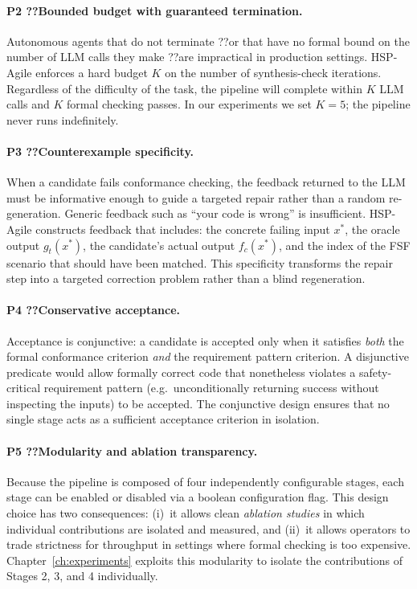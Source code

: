 \paragraph{P2 ??Bounded budget with guaranteed termination.}
Autonomous agents that do not terminate ??or that have no formal bound on the
number of LLM calls they make ??are impractical in production settings.
HSP-Agile enforces a hard budget $K$ on the number of synthesis-check
iterations.  Regardless of the difficulty of the task, the pipeline will
complete within $K$ LLM calls and $K$ formal checking passes.  In our
experiments we set $K = 5$; the pipeline never runs indefinitely.

\paragraph{P3 ??Counterexample specificity.}
When a candidate fails conformance checking, the feedback returned to the
LLM must be informative enough to guide a targeted repair rather than a
random re-generation.  Generic feedback such as ``your code is wrong'' is
insufficient.  HSP-Agile constructs feedback that includes: the concrete
failing input $x^*$, the oracle output $g_t(x^*)$, the candidate's
actual output $f_c(x^*)$, and the index of the FSF scenario that should have
been matched.  This specificity transforms the repair step into a targeted
correction problem rather than a blind regeneration.

\paragraph{P4 ??Conservative acceptance.}
Acceptance is conjunctive: a candidate is accepted only when it satisfies
\emph{both} the formal conformance criterion \emph{and} the requirement
pattern criterion.  A disjunctive predicate would allow formally correct code
that nonetheless violates a safety-critical requirement pattern (e.g.\
unconditionally returning success without inspecting the inputs) to be
accepted.  The conjunctive design ensures that no single stage acts as a
sufficient acceptance criterion in isolation.

\paragraph{P5 ??Modularity and ablation transparency.}
Because the pipeline is composed of four independently configurable stages,
each stage can be enabled or disabled via a boolean configuration flag.  This
design choice has two consequences: (i)~it allows clean \emph{ablation
studies} in which individual contributions are isolated and measured, and
(ii)~it allows operators to trade strictness for throughput in settings
where formal checking is too expensive.  Chapter~\ref{ch:experiments} exploits
this modularity to isolate the contributions of Stages 2, 3, and 4
individually.

